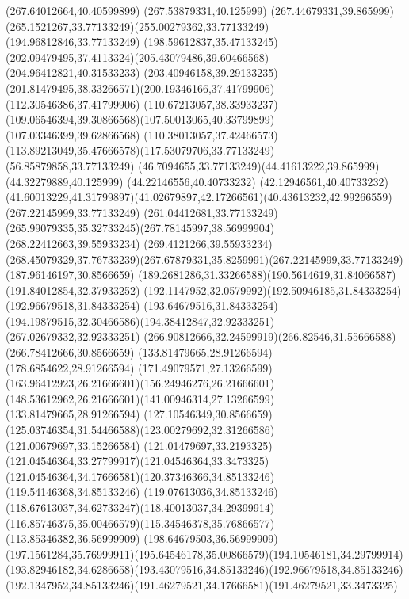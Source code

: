 {{		\lineto(267.64012664,40.40599899)
		\lineto(267.53879331,40.125999)
		\curveto(267.44679331,39.865999)(265.1521267,33.77133249)(255.00279362,33.77133249)
		\lineto(194.96812846,33.77133249)
		\curveto(198.59612837,35.47133245)(202.09479495,37.4113324)(205.43079486,39.60466568)
		\lineto(204.96412821,40.31533233)
		\curveto(203.40946158,39.29133235)(201.81479495,38.33266571)(200.19346166,37.41799906)
		\lineto(112.30546386,37.41799906)
		\curveto(110.67213057,38.33933237)(109.06546394,39.30866568)(107.50013065,40.33799899)
		\lineto(107.03346399,39.62866568)
		\curveto(110.38013057,37.42466573)(113.89213049,35.47666578)(117.53079706,33.77133249)
		\lineto(56.85879858,33.77133249)
		\curveto(46.7094655,33.77133249)(44.41613222,39.865999)(44.32279889,40.125999)
		\lineto(44.22146556,40.40733232)
		\lineto(42.12946561,40.40733232)
		\curveto(41.60013229,41.31799897)(41.02679897,42.17266561)(40.43613232,42.99266559)
		\closepath
		\moveto(267.22145999,33.77133249)
		\lineto(261.04412681,33.77133249)
		\curveto(265.99079335,35.32733245)(267.78145997,38.56999904)(268.22412663,39.55933234)
		\lineto(269.4121266,39.55933234)
		\curveto(268.45079329,37.76733239)(267.67879331,35.8259991)(267.22145999,33.77133249)
		\moveto(187.96146197,30.8566659)
		\curveto(189.2681286,31.33266588)(190.5614619,31.84066587)(191.84012854,32.37933252)
		\curveto(192.1147952,32.0579992)(192.50946185,31.84333254)(192.96679518,31.84333254)
		\curveto(193.64679516,31.84333254)(194.19879515,32.30466586)(194.38412847,32.92333251)
		\lineto(267.02679332,32.92333251)
		\curveto(266.90812666,32.24599919)(266.82546,31.55666588)(266.78412666,30.8566659)
		\closepath
		\moveto(133.81479665,28.91266594)
		\lineto(178.6854622,28.91266594)
		\curveto(171.49079571,27.13266599)(163.96412923,26.21666601)(156.24946276,26.21666601)
		\curveto(148.53612962,26.21666601)(141.00946314,27.13266599)(133.81479665,28.91266594)
		\moveto(127.10546349,30.8566659)
		\curveto(125.03746354,31.54466588)(123.00279692,32.31266586)(121.00679697,33.15266584)
		\curveto(121.01479697,33.2193325)(121.04546364,33.27799917)(121.04546364,33.3473325)
		\curveto(121.04546364,34.17666581)(120.37346366,34.85133246)(119.54146368,34.85133246)
		\curveto(119.07613036,34.85133246)(118.67613037,34.62733247)(118.40013037,34.29399914)
		\curveto(116.85746375,35.00466579)(115.34546378,35.76866577)(113.85346382,36.56999909)
		\lineto(198.64679503,36.56999909)
		\curveto(197.1561284,35.76999911)(195.64546178,35.00866579)(194.10546181,34.29799914)
		\curveto(193.82946182,34.6286658)(193.43079516,34.85133246)(192.96679518,34.85133246)
		\curveto(192.1347952,34.85133246)(191.46279521,34.17666581)(191.46279521,33.3473325)
}}
